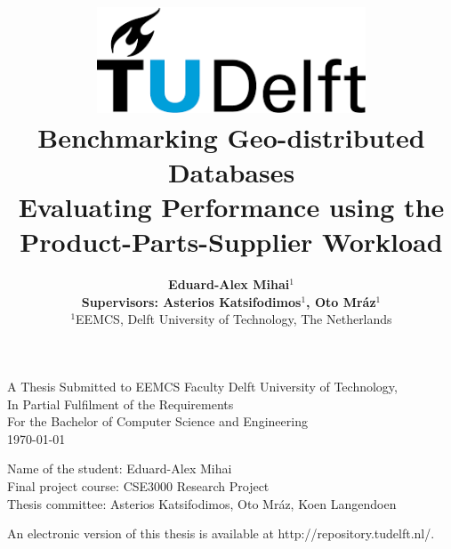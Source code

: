 \title{
    \includegraphics[width=8cm, keepaspectratio]{tudelftlogo.png}\\
    \vspace*{2cm}
    \textbf{
         Benchmarking Geo-distributed Databases \\
         \large Evaluating Performance using the Product-Parts-Supplier Workload
    }\\
    \vspace*{1cm}
}

\author{
    \textbf{Eduard-Alex Mihai$^1$}\\
    \hfill \break
    \textbf{Supervisors: Asterios Katsifodimos$^1$, Oto Mráz$^1$}\\
    \break
    {\large 
        \hfill \break
        $^1$EEMCS, Delft University of Technology, The Netherlands
    }\\
}

\date{}

\maketitle
\thispagestyle{empty}

\let\clearpagebackup\clearpage
\renewcommand{\clearpage}{ }

\onecolumn

\vspace*{1.5cm}
\begin{center}
    A Thesis Submitted to EEMCS Faculty Delft University of Technology,\\
    In Partial Fulfilment of the Requirements\\
    For the Bachelor of Computer Science and Engineering\\
    \today
\end{center}

\vspace*{2cm}

\noindent
{\small
Name of the student: Eduard-Alex Mihai \\
Final project course: CSE3000 Research Project\\
Thesis committee: Asterios Katsifodimos, Oto Mráz, Koen Langendoen\\
}
\vfill

\begin{center}
    An electronic version of this thesis is available at http://repository.tudelft.nl/.
\end{center}

\twocolumn
\let\clearpage\clearpagebackup  
\clearpage
\setcounter{page}{1}
